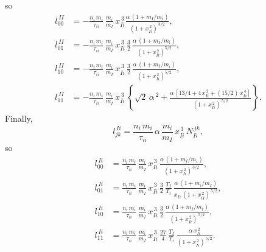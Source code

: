 \documentclass[12pt]{article}
\begin{document}
so
\begin{align}
l^{\,II}_{00} &= -\frac{n_i\,m_i}{\tau_{ii}}\,\frac{m_i}{m_I}\,x_{Ii}^{\,3}\frac{\alpha\,(1+m_I/m_i)}{(1+x_{Ii}^{\,2})^{\,3/2}},\\[0.5ex]
l^{\,II}_{01}&= -\frac{n_i\,m_i}{\tau_{ii}}\,\frac{m_i}{m_I}\,x_{Ii}^{\,3}\,\frac{3}{2}\,\frac{\alpha\,(1+m_I/m_i)}{(1+x_{Ii}^{\,2})^{5/2}},\\[0.5ex]
l^{\,II}_{10}&= -\frac{n_i\,m_i}{\tau_{ii}}\,\frac{m_i}{m_I}\,x_{Ii}^{\,3}\,\frac{3}{2}\,\frac{\alpha\,(1+m_I/m_i)}{(1+x_{Ii}^{\,2})^{5/2}},\\[0.5ex]
l^{\,II}_{11}& = -\frac{n_i\,m_i}{\tau_{ii}}\,\frac{m_i}{m_I}\,x_{Ii}^{\,3}\,\left\{\sqrt{2}\,\alpha^{\,2}+
\frac{\alpha\,[13/4+4\,x_{Ii}^{\,2}+(15/2)\,x_{Ii}^{\,4}]}{(1+x_{Ii}^{\,2})^{\,5/2}}
\right\}.
\end{align}
Finally, 
\begin{equation}
l_{jk}^{\,Ii} = \frac{n_i\,m_i}{\tau_{ii}}\,\alpha\,\frac{m_i}{m_I}\,x_{Ii}^{\,3}\,N_{Ii}^{\,jk},
\end{equation}
so 
\begin{align}
l^{\,Ii}_{00} &= \frac{n_i\,m_i}{\tau_{ii}}\,\frac{m_i}{m_I}\,x_{Ii}^{\,3}\,\frac{\alpha\,(1+m_I/m_i)}{(1+x_{Ii}^{\,2})^{\,3/2}},\\[0.5ex]
l^{\,Ii}_{01}&= \frac{n_i\,m_i}{\tau_{ii}}\,\frac{m_i}{m_I}\,x_{Ii}^{\,3}\,\frac{3}{2}\,\frac{T_I}{T_i}\,\frac{\alpha\,(1+m_i/m_I)}{x_{Ii}\,(1+x_{iI}^{\,2})^{\,5/2}},\\[0.5ex]
l^{\,Ii}_{10}&= \frac{n_i\,m_i}{\tau_{ii}}\,\frac{m_i}{m_I}\,x_{Ii}^{\,3}\,\frac{3}{2}\,\frac{\alpha\,(1+m_I/m_i)}{(1+x_{Ii}^{\,2})^{\,5/2}},\\[0.5ex]
l^{\,Ii}_{11}& = \frac{n_i\,m_i}{\tau_{ii}}\,\frac{m_i}{m_I}\,x_{Ii}^{\,3}\,\frac{27}{4}\,\frac{T_I}{T_i}\,\frac{\alpha\,x_{Ii}^{\,2}}{(1+x_{Ii}^{\,2})^{\,5/2}}.
\end{align}
\end{document}
